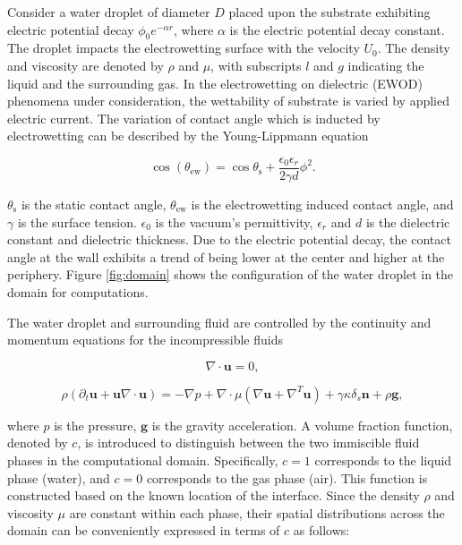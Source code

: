 \documentclass[lineno]{cls/jfm}
\begin{document}
Consider a water droplet of diameter $D$ placed upon the substrate exhibiting electric potential decay $\phi_0 e^{-\alpha r}$, where $\alpha$ is the electric potential decay constant. The droplet impacts the electrowetting surface with the velocity $U_0$. The density and viscosity are denoted by $\rho$ and $\mu$, with subscripts $l$ and $g$ indicating the liquid and the surrounding gas. In the electrowetting on dielectric (EWOD) phenomena under consideration, the wettability of substrate is varied by applied electric current. The variation of contact angle which is inducted by electrowetting can be described by the Young-Lippmann equation

\begin{equation}
	\cos(\theta_{\mathrm{ew}}) = \cos\theta_{\mathrm{s}} + \frac{\epsilon_0 \epsilon_r}{2 \gamma d} \phi^2 .
  \label{Young-Lippmann equation}
\end{equation}

\noindent $\theta_{\mathrm{s}}$ is the static contact angle, $\theta_{\mathrm{ew}}$ is the electrowetting induced contact angle, and $\gamma$ is the surface tension. $\epsilon_0$ is the vacuum's permittivity, $\epsilon_r$ and $d$ is the dielectric constant and dielectric thickness. Due to the electric potential decay, the contact angle at the wall exhibits a trend of being lower at the center and higher at the periphery. Figure \ref{fig:domain} shows the configuration of the water droplet in the domain for computations. 

The water droplet and surrounding fluid are controlled by the continuity and momentum equations for the incompressible fluids

\begin{equation}
  \nabla \cdot \mathbf{u} = 0,
  \label{continuity equation}
\end{equation}

\begin{equation}
  \rho(\partial_t \mathbf{u} + \mathbf{u} \nabla \cdot \mathbf{u})=-\nabla p + \nabla \cdot \mu (\nabla\mathbf{u}+\nabla^T\mathbf{u}) + \gamma \kappa \delta_s \mathbf{n} + \rho \mathbf{g} ,
  \label{momentum equation}
\end{equation}

\noindent where $p$ is the pressure, $\mathbf{g}$ is the gravity acceleration. A volume fraction function, denoted by $c$, is introduced to distinguish between the two immiscible fluid phases in the computational domain. Specifically, $c = 1$ corresponds to the liquid phase (water), and $c = 0$ corresponds to the gas phase (air). This function is constructed based on the known location of the interface. Since the density $\rho$ and viscosity $\mu$ are constant within each phase, their spatial distributions across the domain can be conveniently expressed in terms of $c$ as follows:
\end{document}
